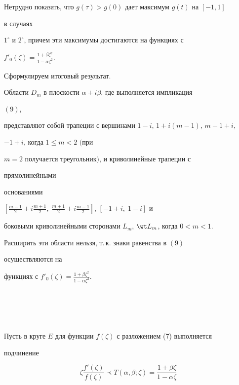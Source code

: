 Нетрудно показать, что $g(\tau)>g(0)$ дает максимум $g(t)$ на $[-1,1]$


в случаях


$1^\circ$ и $2^\circ$, причем эти максимумы достигаются на функциях с


$f'_0(\zeta)=\frac{1+\beta\zeta^2}{1-\alpha\zeta^2}$.





Сформулируем итоговый результат.





\begin{thm}


Области $D_m$ в плоскости $\alpha+i\beta$, где выполняется импликация


$(9)$,


представляют собой трапеции с вершинами $1-i$, $1+i(m-1)$, $m-1+i$,


$-1+i$, когда $1\le m<2$ $($при


$m=2$ получается треугольник$)$, и криволинейные трапеции с


прямолинейными


основаниями


$\left[\frac{m-1}{2}+i\frac{m+1}{2},\;\frac{m+1}{2}+i\frac{m-1}{2}


\right]$, $[-1+i,\;1-i]$ и


боковыми криволинейными сторонами $L_m$, $\wt L_m$, когда $0<m<1$.


Расширить эти области нельзя, т.\,к. знаки равенства в $(9)$


осуществляются на


функциях с $f'_0(\zeta)=\frac{1+\beta\zeta^2}{1-\alpha\zeta^2}$.


\end{thm}





\section{\ }





Пусть в круге $E$ для функции $f(\zeta)$ с разложением (7) выполняется


подчинение


\begin{equation}


\zeta\frac{f'(\zeta)}{f(\zeta)}\prec T(\alpha,\beta;\zeta)=


\frac{1+\beta\zeta}{1-\alpha\zeta}


\end{equation}


